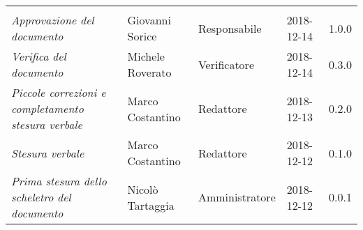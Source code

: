 \newpage 
\section*{}
\begin{table}[H]
	\centering
	\begin{tabular}{p{4cm}|C{3cm}|C{3cm}|R{2.5cm}|R{2cm}}
		
		 & & & & \\
		
		
		\emph{Approvazione del documento} & Giovanni Sorice & Responsabile & 2018-12-14 & 1.0.0 \\
		\hline
		
		\emph{Verifica del documento} & Michele Roverato & Verificatore & 2018-12-14 & 0.3.0 \\
		\hline

		\emph{Piccole correzioni e completamento stesura verbale} & Marco Costantino & Redattore& 2018-12-13 & 0.2.0 \\
		\hline

		\emph{Stesura verbale} & Marco Costantino & Redattore & 2018-12-12 & 0.1.0 \\
		\hline
		
		\emph{Prima stesura dello scheletro del documento} & Nicolò Tartaggia & Amministratore & 2018-12-12 & 0.0.1 \\
		
	\end{tabular}
	
\end{table}


\clearpage